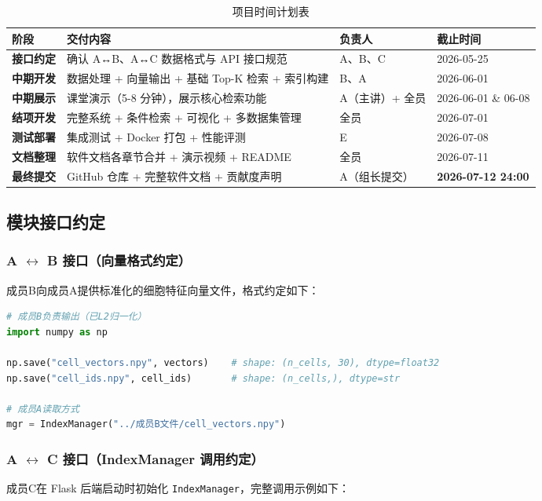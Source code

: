 \documentclass[a4paper]{article}
\begin{document}
\begin{table}[H]
\centering
\small
\caption{项目时间计划表}
\begin{tabularx}{\linewidth}{p{2.5cm}p{3.5cm}p{3cm}X}
\toprule
阶段 & 交付内容 & 负责人 & 截止时间 \\
\midrule
\textbf{接口约定} & 确认 A↔B、A↔C 数据格式与 API 接口规范 & A、B、C & 2026-05-25 \\
\textbf{中期开发} & 数据处理 + 向量输出 + 基础 Top-K 检索 + 索引构建 & B、A & 2026-06-01 \\
\textbf{中期展示} & 课堂演示（5-8 分钟），展示核心检索功能 & A（主讲）+ 全员 & 2026-06-01 \& 06-08 \\
\textbf{结项开发} & 完整系统 + 条件检索 + 可视化 + 多数据集管理 & 全员 & 2026-07-01 \\
\textbf{测试部署} & 集成测试 + Docker 打包 + 性能评测 & E & 2026-07-08 \\
\textbf{文档整理} & 软件文档各章节合并 + 演示视频 + README & 全员 & 2026-07-11 \\
\textbf{最终提交} & GitHub 仓库 + 完整软件文档 + 贡献度声明 & A（组长提交） & \textbf{2026-07-12 24:00} \\
\bottomrule
\end{tabularx}
\end{table}

\subsection{模块接口约定}

\subsubsection{A $\leftrightarrow$ B 接口（向量格式约定）}
成员B向成员A提供标准化的细胞特征向量文件，格式约定如下：

\begin{lstlisting}[language=Python, caption=成员B输出格式（供成员A使用）]
# 成员B负责输出（已L2归一化）
import numpy as np

np.save("cell_vectors.npy", vectors)    # shape: (n_cells, 30), dtype=float32
np.save("cell_ids.npy", cell_ids)       # shape: (n_cells,), dtype=str

# 成员A读取方式
mgr = IndexManager("../成员B文件/cell_vectors.npy")
\end{lstlisting}

\subsubsection{A $\leftrightarrow$ C 接口（IndexManager 调用约定）}
成员C在 Flask 后端启动时初始化 \texttt{IndexManager}，完整调用示例如下：
\end{document}
